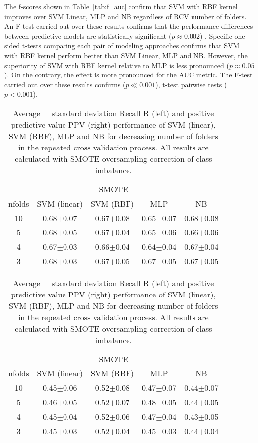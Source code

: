 \documentclass[10pt,leqno]{amsart}
\begin{document}
The f-scores shown in Table~\ref{tab:f_auc} confirm that SVM with RBF kernel improves over SVM Linear, MLP and NB regardless of RCV number of folders. An F-test carried out over these results confirms that the performance differences between predictive models are statistically significant  ($p\approx0.002$) . Specific one-sided t-tests comparing each pair of modeling approaches confirms that SVM with RBF kernel perform better than SVM Linear, MLP and NB. However, the superiority of SVM with RBF kernel relative to MLP is less pronounced ($p\approx0.05$). On the contrary, the effect is more pronounced for the AUC metric. The F-test carried out over these results confirms ($p\ll0.001$), t-test pairwise tests ($p<0.001$). 
\begin{table}[!htbp]
\centering
\footnotesize
\caption{Average $\pm$ standard deviation Recall R (left) and positive predictive value PPV (right) performance of SVM (linear), SVM (RBF), MLP and NB for decreasing number of folders in the repeated cross validation process. All results are calculated with SMOTE oversampling correction of class imbalance.}
\label{tab:r_ppv}
\begin{tabular}{*5c}
\toprule
  \multicolumn{5}{c}{SMOTE} \\
nfolds & SVM (linear) & SVM (RBF) & MLP & NB
\\
\midrule
10 & 0.68$\pm$0.07 & 0.67$\pm$0.08 & 0.65$\pm$0.07 & 0.68$\pm$0.08
\\
5 & 0.68$\pm$0.05 & 0.67$\pm$0.04 & 0.65$\pm$0.06 & 0.66$\pm$0.06
\\
4 & 0.67$\pm$0.03 & 0.66$\pm$0.04 & 0.64$\pm$0.04 & 0.67$\pm$0.04
\\
3 & 0.68$\pm$0.03 & 0.67$\pm$0.05 & 0.67$\pm$0.05 & 0.67$\pm$0.05
\\
\bottomrule
\end{tabular}
\quad
\begin{tabular}{*5c}
\toprule
  \multicolumn{5}{c}{SMOTE} \\
nfolds & SVM (linear) & SVM (RBF) & MLP & NB
\\
\midrule
10 & 0.45$\pm$0.06 & 0.52$\pm$0.08 & 0.47$\pm$0.07 & 0.44$\pm$0.07
\\
5 & 0.46$\pm$0.05 & 0.52$\pm$0.07 & 0.48$\pm$0.05 & 0.44$\pm$0.05
\\
4 & 0.45$\pm$0.04 & 0.52$\pm$0.06 & 0.47$\pm$0.04 & 0.43$\pm$0.05
\\
3 & 0.45$\pm$0.03 & 0.52$\pm$0.04 & 0.45$\pm$0.03 & 0.44$\pm$0.04
\\
\bottomrule
\end{tabular}
\end{table}
\end{document}
